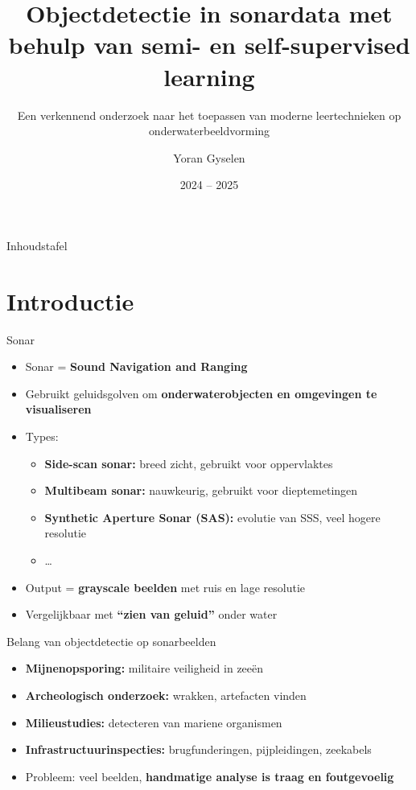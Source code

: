 \documentclass[aspectratio=169]{beamer}
\title{Objectdetectie in sonardata met behulp van semi- en self-supervised learning}
\subtitle{Een verkennend onderzoek naar het toepassen van moderne leertechnieken op onderwaterbeeldvorming}
\author{Yoran Gyselen}
\institute[HOGENT]{Hogeschool Gent}
\date{2024 -- 2025}
\begin{document}
    
    \begin{frame}{}
        \titlepage
    \end{frame}
    
    \begin{frame}{Inhoudstafel}
        \tableofcontents
    \end{frame}
    
    \section{Introductie}
    
    \begin{frame}{Sonar}
        \begin{itemize}
            \item Sonar = \textbf{Sound Navigation and Ranging}
            \item Gebruikt geluidsgolven om \textbf{onderwaterobjecten en omgevingen te visualiseren}
            \item Types:
            \begin{itemize}
                \item \textbf{Side-scan sonar:} breed zicht, gebruikt voor oppervlaktes
                \item \textbf{Multibeam sonar:} nauwkeurig, gebruikt voor dieptemetingen
                \item \textbf{Synthetic Aperture Sonar (SAS):} evolutie van SSS, veel hogere resolutie
                \item \dots
            \end{itemize}
            \item Output = \textbf{grayscale beelden} met ruis en lage resolutie
            \item Vergelijkbaar met \textbf{``zien van geluid''} onder water
        \end{itemize}
    \end{frame}
    
    \begin{frame}{Belang van objectdetectie op sonarbeelden}
        \begin{itemize}
            \item \textbf{Mijnenopsporing:} militaire veiligheid in zeeën
            \item \textbf{Archeologisch onderzoek:} wrakken, artefacten vinden
            \item \textbf{Milieustudies:} detecteren van mariene organismen
            \item \textbf{Infrastructuurinspecties:} brugfunderingen, pijpleidingen, zeekabels
        \end{itemize}
        \begin{itemize}
            \item Probleem: veel beelden, \textbf{handmatige analyse is traag en foutgevoelig}
        \end{itemize}
    \end{frame}
    
\end{document}
